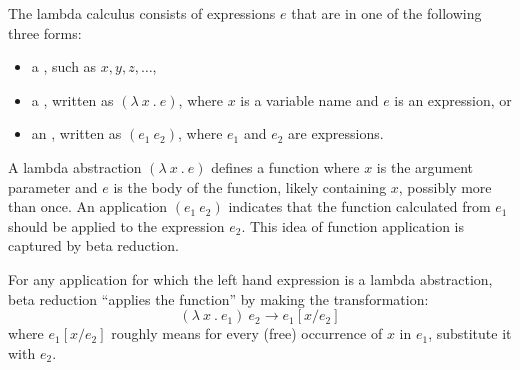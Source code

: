 \begin{cluster}
\label{grp:def:lc::syntax}

\begin{definition}
\label{def:lc::syntax}
The lambda calculus consists of expressions $e$ that are in one
of the following three forms:

\begin{itemize}
\item a , such as $x, y, z, \ldots$,

\item a , written as $(\lambda~x~.~e)$, where $x$ is a variable name and $e$ is
  an expression, or

\item an , written as $(e_1~e_2)$, where $e_1$ and
  $e_2$ are expressions.
\end{itemize}

\end{definition}
\end{cluster}

\begin{cluster}
\label{grp:grm:lambda-calculus::lambda}

\begin{gram}
\label{grm:lambda-calculus::lambda}
{}
A lambda abstraction $(\lambda~x~.~e)$  defines a function where $x$ is the argument parameter 
and $e$ is the body of the function, likely containing $x$, possibly
more than once.    An application $(e_1~e_2)$ indicates 
that the function calculated from $e_1$ should be applied to the expression $e_2$.   This idea 
of function application is captured by beta reduction. 

\end{gram}
\end{cluster}

\begin{cluster}
\label{grp:def:lc::beta}

\begin{definition}
\label{def:lc::beta}
For any application for which the left hand expression is a lambda abstraction, beta reduction ``applies the function'' by making the 
transformation: 
\[ (\lambda~x~.~e_1)~e_2 \longrightarrow e_1[x/e_2] \]
where $e_1[x/e_2]$ roughly means for every (free) occurrence of $x$ in 
$e_1$, substitute it with $e_2$.  

\end{definition}
\end{cluster}

